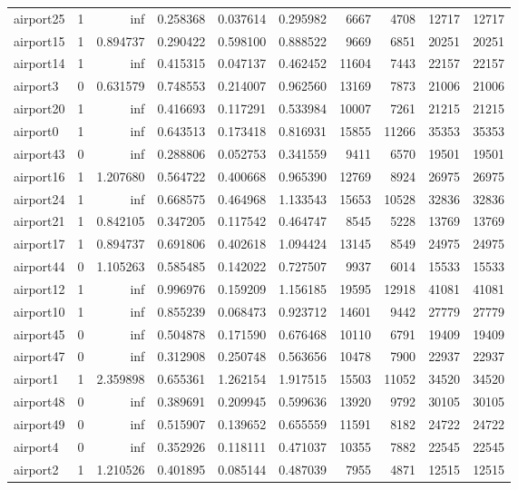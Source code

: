 \begin{longtable}{|l|r|r|r|r|r|r|r|r|r|}
airport25 & 1 & inf & 0.258368 & 0.037614 & 0.295982 & 6667 & 4708 & 12717 & 12717 \\
airport15 & 1 & 0.894737 & 0.290422 & 0.598100 & 0.888522 & 9669 & 6851 & 20251 & 20251 \\
airport14 & 1 & inf & 0.415315 & 0.047137 & 0.462452 & 11604 & 7443 & 22157 & 22157 \\
airport3 & 0 & 0.631579 & 0.748553 & 0.214007 & 0.962560 & 13169 & 7873 & 21006 & 21006 \\
airport20 & 1 & inf & 0.416693 & 0.117291 & 0.533984 & 10007 & 7261 & 21215 & 21215 \\
airport0 & 1 & inf & 0.643513 & 0.173418 & 0.816931 & 15855 & 11266 & 35353 & 35353 \\
airport43 & 0 & inf & 0.288806 & 0.052753 & 0.341559 & 9411 & 6570 & 19501 & 19501 \\
airport16 & 1 & 1.207680 & 0.564722 & 0.400668 & 0.965390 & 12769 & 8924 & 26975 & 26975 \\
airport24 & 1 & inf & 0.668575 & 0.464968 & 1.133543 & 15653 & 10528 & 32836 & 32836 \\
airport21 & 1 & 0.842105 & 0.347205 & 0.117542 & 0.464747 & 8545 & 5228 & 13769 & 13769 \\
airport17 & 1 & 0.894737 & 0.691806 & 0.402618 & 1.094424 & 13145 & 8549 & 24975 & 24975 \\
airport44 & 0 & 1.105263 & 0.585485 & 0.142022 & 0.727507 & 9937 & 6014 & 15533 & 15533 \\
airport12 & 1 & inf & 0.996976 & 0.159209 & 1.156185 & 19595 & 12918 & 41081 & 41081 \\
airport10 & 1 & inf & 0.855239 & 0.068473 & 0.923712 & 14601 & 9442 & 27779 & 27779 \\
airport45 & 0 & inf & 0.504878 & 0.171590 & 0.676468 & 10110 & 6791 & 19409 & 19409 \\
airport47 & 0 & inf & 0.312908 & 0.250748 & 0.563656 & 10478 & 7900 & 22937 & 22937 \\
airport1 & 1 & 2.359898 & 0.655361 & 1.262154 & 1.917515 & 15503 & 11052 & 34520 & 34520 \\
airport48 & 0 & inf & 0.389691 & 0.209945 & 0.599636 & 13920 & 9792 & 30105 & 30105 \\
airport49 & 0 & inf & 0.515907 & 0.139652 & 0.655559 & 11591 & 8182 & 24722 & 24722 \\
airport4 & 0 & inf & 0.352926 & 0.118111 & 0.471037 & 10355 & 7882 & 22545 & 22545 \\
airport2 & 1 & 1.210526 & 0.401895 & 0.085144 & 0.487039 & 7955 & 4871 & 12515 & 12515 \\

\end{longtable}
